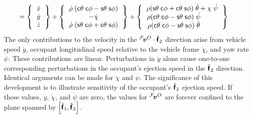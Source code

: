 \documentclass[10pt,twocolumn,reqno]{amsart}
\begin{document}
\begin{eqnarray}
\label{eq:velocitySpecialCase}
\\
&= 
\left\{  
	\begin{tabular}{c}
 	  	$\dot{x}$ \\ 
 		$\dot{y}$ \\ 
 		$\dot{z}$
 	\end{tabular}
\right\}
+
\left\{  
	\begin{tabular}{c}
 	  	$\dot{\rho} \; (\hcos \theta \; \hcos \phi - \hsin \theta \; \hsin \phi)$ \\ 
 		$-\dot{\chi}$ \\ 
 		$\dot{\rho} \; (\hsin \theta \; \hcos \phi + \hcos \theta \; \hsin \phi)$
 	\end{tabular}
\right\}
+
\left\{  
	\begin{tabular}{c}
 	  	$\rho (\hsin \theta \; \hcos \phi + \hcos \theta \; \hsin \phi) \; 
			\dot{\theta} + \chi \; \dot{\psi}$ \\ 
 		$\rho (\hcos \theta \; \hcos \phi - \hsin \theta \; \hsin \phi) \; 
			\dot{\psi} \;\;\;\;\;\;\;\; \;$ \\ 
 		$\rho (\hcos \theta \; \hcos \phi - \hsin \theta \; \hsin \phi) \; 
			\dot{\theta} \;\;\;\;\;\;\;\; \;$
 	\end{tabular}
\right\}
\end{eqnarray}
The only contributions to the velocity 
in the ${}^{\mathcal{F}}\!\mbox{\boldmath $v$}^{O} \cdot \hat{\mbox{\boldmath $\sf{f}$}}_2$ direction 
arise from vehicle speed $\dot{y}$,
occupant longitudinal speed relative to the vehicle frame $\dot{\chi}$,
and yaw rate $\dot{\psi}$.
These contributions are linear. 
Perturbations in
$\dot{y}$ alone cause one-to-one corresponding perturbations in the 
occupant's ejection speed in the $\hat{\mbox{\boldmath $\sf{f}$}}_2$ direction.  Identical arguments
can be made for $\dot{\chi}$ and $\dot{\psi}$.  
The significance of this development is to 
illustrate sensitivity of the occupant's $\hat{\mbox{\boldmath $\sf{f}$}}_2$ ejection speed.
If these values, $\dot{y}$, $\dot{\chi}$, and $\dot{\psi}$ are zero, the values for 
${}^{\mathcal{F}}\!\mbox{\boldmath $v$}^{O}$ are forever confined to the plane spanned by 
$\left[ \hat{\mbox{\boldmath $\sf{f}$}}_1, \hat{\mbox{\boldmath $\sf{f}$}}_3 \right]$.
\end{document}
